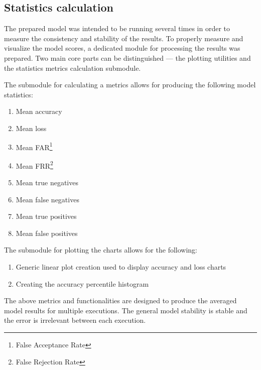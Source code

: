 \subsection{Statistics calculation}\label{subsec:statistics-calculation}
The prepared model was intended to be running several times in order to measure the consistency and stability of the results.
To properly measure and visualize the model scores, a dedicated module for processing the results was prepared.
Two main core parts can be distinguished --- the plotting utilities and the statistics metrics calculation submodule.

The submodule for calculating a metrics allows for producing the following model statistics:
\begin{enumerate}
    \item Mean accuracy
    \item Mean loss
    \item Mean FAR\footnote{False Acceptance Rate}
    \item Mean FRR\footnote{False Rejection Rate}
    \item Mean true negatives
    \item Mean false negatives
    \item Mean true positives
    \item Mean false positives
\end{enumerate}

The submodule for plotting the charts allows for the following:
\begin{enumerate}
    \item Generic linear plot creation used to display accuracy and loss charts
    \item Creating the accuracy percentile histogram
\end{enumerate}

The above metrics and functionalities are designed to produce the averaged model results for multiple executions.
The general model stability is stable and the error is irrelevant between each execution.